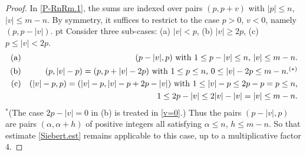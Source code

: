 \documentclass[11pt,draft,reqno]{amsart}
\theoremstyle{definition}
\theoremstyle{remarks}
\numberwithin{equation}{section}
\def \a{{\alpha}}
\def \p{{\varphi}}
\begin{document}
\begin{proof}
In    \eqref{P-RnRm.1}, the  sums are indexed over   pairs $(p,p+v)$ with $|p|\le n$, $|v|\le m-n$.   By symmetry, %
it     suffices to restrict to the case $p>0$, $v<0$, namely $(p,p-|v|)$.  
 pt Consider three sub-cases: (a) $|v|< p$, (b) $|v|\ge 2p$, (c) $p\le  |v|<2p$.  
\begin{eqnarray*}
{\rm (a)}& &
\hbox{$(p-|v|,p)$ with  $1\le p-|v|\le n$, $|v|\le m-n$.}
\cr {\rm (b)} & & \hbox{%
$(p, |v|- p)=(p,p+|v|-2p)$  with $1\le p\le n$, ${0\le |v|-2p\le m-n}.^{(*)}$}
   \cr {\rm (c)} & &
    \hbox{$(|v|-p, p)=(|v|-p,|v|-p+2p-|v|)$ with $1\le |v|-p\le 2p-p=p\le n$,}     \cr & & \hbox{
      $1\le 2p-|v|\le 2|v|-|v|=|v|\le m-n$.}
\end{eqnarray*}
 ${}^*$(The case $2p-|v|=0$ in (b) is treated in  \eqref{v=0}.) %
  Thus  the pairs $(p-|v|,p)$ are pairs $(\a, \a+h)$ of positive integers   all satisfying  $\a\le n$, $h\le m-n$. So that estimate \eqref{Siebert.est} remains applicable to this case, up to a multiplicative factor 4.%
\vskip 2pt


\end{proof}
\end{document}
